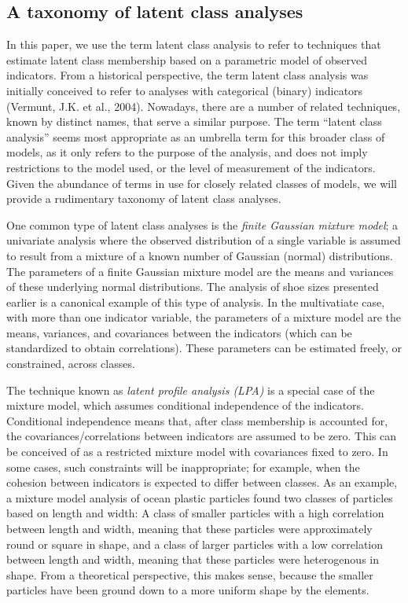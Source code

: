 \documentclass[
  ,man]{apa6}
\begin{document}
\hypertarget{a-taxonomy-of-latent-class-analyses}{%
\subsection{A taxonomy of latent class analyses}\label{a-taxonomy-of-latent-class-analyses}}

In this paper, we use the term latent class analysis to refer to techniques that estimate latent class membership based on a parametric model of observed indicators.
From a historical perspective, the term latent class analysis was initially conceived to refer to analyses with categorical (binary) indicators (Vermunt, J.K. et al., 2004).
Nowadays, there are a number of related techniques, known by distinct names, that serve a similar purpose.
The term ``latent class analysis'' seems most appropriate as an umbrella term for this broader class of models,
as it only refers to the purpose of the analysis, and does not imply restrictions to the model used, or the level of measurement of the indicators.
Given the abundance of terms in use for closely related classes of models, we will provide a rudimentary taxonomy of latent class analyses.

One common type of latent class analyses is the \emph{finite Gaussian mixture model};
a univariate analysis where the observed distribution of a single variable is assumed to result from a mixture of a known number of Gaussian (normal) distributions.
The parameters of a finite Gaussian mixture model are the means and variances of these underlying normal distributions.
The analysis of shoe sizes presented earlier is a canonical example of this type of analysis.
In the multivatiate case, with more than one indicator variable,
the parameters of a mixture model are the means, variances, and covariances between the indicators (which can be standardized to obtain correlations).
These parameters can be estimated freely, or constrained, across classes.

The technique known as \emph{latent profile analysis (LPA)} is a special case of the mixture model,
which assumes conditional independence of the indicators.
Conditional independence means that,
after class membership is accounted for,
the covariances/correlations between indicators are assumed to be zero.
This can be conceived of as a restricted mixture model with covariances fixed to zero.
In some cases, such constraints will be inappropriate;
for example, when the cohesion between indicators is expected to differ between classes.
As an example, a mixture model analysis of ocean plastic particles found two classes of particles based on length and width:
A class of smaller particles with a high correlation between length and width, meaning that these particles were approximately round or square in shape, and a class of larger particles with a low correlation between length and width, meaning that these particles were heterogenous in shape.
From a theoretical perspective, this makes sense, because the smaller particles have been ground down to a more uniform shape by the elements.
\end{document}
